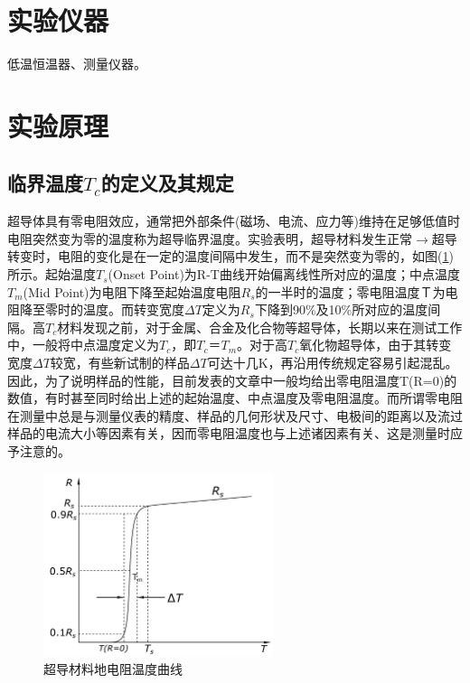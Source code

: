 \documentclass[a4paper]{article}
\begin{document}
\section{实验仪器}
低温恒温器、测量仪器。

\section{实验原理}
\subsection{临界温度$T_c$的定义及其规定}
超导体具有零电阻效应，通常把外部条件(磁场、电流、应力等)维持在足够低值时电阻突然变为零的温度称为超导临界温度。实验表明，超导材料发生正常$\to$超导转变时，电阻的变化是在一定的温度间隔中发生，而不是突然变为零的，如图(\ref{fig1})所示。起始温度$T_s$(Onset Point)为R-T曲线开始偏离线性所对应的温度；中点温度$T_m$(Mid Point)为电阻下降至起始温度电阻$R_s$的一半时的温度；零电阻温度Ｔ为电阻降至零时的温度。而转变宽度$\Delta T$定义为$R_s$下降到90\%及10\%所对应的温度间隔。高$T_c$材料发现之前，对于金属、合金及化合物等超导体，长期以来在测试工作中，一般将中点温度定义为$T_c$，即$T_c$＝$T_m$。对于高$T_c$氧化物超导体，由于其转变宽度$\Delta T$较宽，有些新试制的样品$\Delta T$可达十几K，再沿用传统规定容易引起混乱。因此，为了说明样品的性能，目前发表的文章中一般均给出零电阻温度T(R=0)的数值，有时甚至同时给出上述的起始温度、中点温度及零电阻温度。而所谓零电阻在测量中总是与测量仪表的精度、样品的几何形状及尺寸、电极间的距离以及流过样品的电流大小等因素有关，因而零电阻温度也与上述诸因素有关、这是测量时应予注意的。
\begin{figure}[!h]
\centering
\includegraphics[width=0.6\textwidth]{fig/fig1.pdf}
\caption{超导材料地电阻温度曲线}\label{fig1}
\end{figure}
\end{document}
